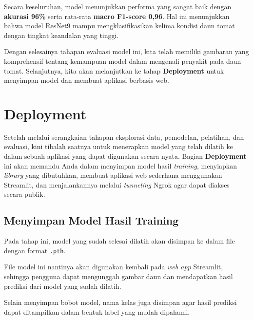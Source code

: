 Secara keseluruhan, model menunjukkan performa yang sangat baik dengan \textbf{akurasi 96\%} serta rata-rata \textbf{macro F1-score 0,96}. Hal ini menunjukkan bahwa model ResNet9 mampu mengklasifikasikan kelima kondisi daun tomat dengan tingkat keandalan yang tinggi.

Dengan selesainya tahapan evaluasi model ini, kita telah memiliki gambaran yang komprehensif tentang kemampuan model dalam mengenali penyakit pada daun tomat. Selanjutnya, kita akan melanjutkan ke tahap \textbf{Deployment} untuk menyimpan model dan membuat aplikasi berbasis web.

\section{Deployment}

Setelah melalui serangkaian tahapan eksplorasi data, pemodelan, pelatihan, dan evaluasi, kini tibalah saatnya untuk menerapkan model yang telah dilatih ke dalam sebuah aplikasi yang dapat digunakan secara nyata. Bagian \textbf{Deployment} ini akan memandu Anda dalam menyimpan model hasil \textit{training}, menyiapkan \textit{library} yang dibutuhkan, membuat aplikasi web sederhana menggunakan Streamlit, dan menjalankannya melalui \textit{tunneling} Ngrok agar dapat diakses secara publik.

\subsection{Menyimpan Model Hasil Training}

Pada tahap ini, model yang sudah selesai dilatih akan disimpan ke dalam file dengan format \texttt{.pth}.

File model ini nantinya akan digunakan kembali pada \textit{web app} Streamlit, sehingga pengguna dapat mengunggah gambar daun dan mendapatkan hasil prediksi dari model yang sudah dilatih.

Selain menyimpan bobot model, nama kelas juga disimpan agar hasil prediksi dapat ditampilkan dalam bentuk label yang mudah dipahami.

